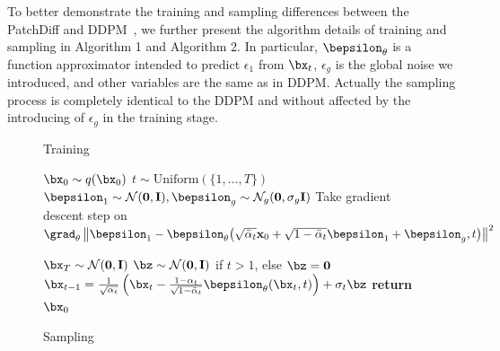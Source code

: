 To better demonstrate the training and sampling differences between the PatchDiff and DDPM~\cite{DDPM}, we further present the algorithm details 
of training and sampling in Algorithm 1 and Algorithm 2. In particular, $\bepsilon_\theta$ is a function approximator intended to predict $\epsilon_1$ from $\bx_t$, $\epsilon_g$ is the global noise we introduced, and other variables are the same as in DDPM. Actually the sampling process is completely identical to the DDPM and without affected by the introducing of $\epsilon_g$ in the training stage.
\begin{figure}[!htpb]
\begin{minipage}[t]{0.495\textwidth}
\begin{algorithm}[H]
  \caption{Training} \label{alg:training}
  \small
  \begin{algorithmic}[1]
    \Repeat
      \State $\bx_0 \sim q(\bx_0)$
      \State $t \sim \mathrm{Uniform}(\{1, \dotsc, T\})$
      \State $\bepsilon_{1}\sim\mathcal{N}(\mathbf{0}, \mathbf{I}), \bepsilon_{g}\sim\mathcal{N}_g(\mathbf{0}, \sigma_g\mathbf{I})$
      \State Take gradient descent step on
      \State $\grad_\theta \left\| \bepsilon_1 - \bepsilon_\theta\bigl(\sqrt{\bar{\alpha}_t} \mathbf{x}_0 + \sqrt{1-\bar{\alpha}_t} \bepsilon_1 + \bepsilon_g, t\bigr) \right\|^2$
  \end{algorithmic}
\end{algorithm}
\end{minipage}
\hfill
\begin{minipage}[t]{0.495\textwidth}
\begin{algorithm}[H]
  \caption{Sampling} \label{alg:sampling}
  \small
  \begin{algorithmic}[1]
    \vspace{.04in}
    \State $\bx_T \sim \mathcal{N}(\mathbf{0}, \mathbf{I})$
      \State $\bz \sim \mathcal{N}(\mathbf{0}, \mathbf{I})$ if $t > 1$, else $\bz = \mathbf{0}$
      \State $\bx_{t-1} = \frac{1}{\sqrt{\alpha_t}}\left( \bx_t - \frac{1-\alpha_t}{\sqrt{1-\bar\alpha_t}} \bepsilon_\theta(\bx_t, t) \right) + \sigma_t \bz$
    \EndFor
    \State \textbf{return} $\bx_0$
    \vspace{.04in}
  \end{algorithmic}
\end{algorithm}
\end{minipage}
\end{figure}


